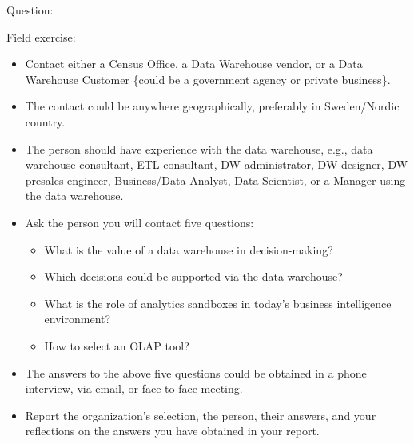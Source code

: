 Question:\\
\begin{em}
Field exercise:

\begin{itemize}
    \item Contact either a Census Office, a Data Warehouse vendor, or a Data Warehouse
    Customer \{could be a government agency or private business\}.
    
    \item The contact could be anywhere geographically, preferably in Sweden/Nordic
    country.
    
    \item The person should have experience with the data warehouse, e.g., data
    warehouse consultant, ETL consultant, DW administrator, DW designer, DW presales
    engineer, Business/Data Analyst, Data Scientist, or a Manager using the
    data warehouse.
    
    \item Ask the person you will contact five questions:
    \begin{itemize}
        \item What is the value of a data warehouse in decision-making?
        \item Which decisions could be supported via the data warehouse?
        \item What is the role of analytics sandboxes in today's business intelligence environment?
        \item How to select an OLAP tool?
    \end{itemize}
    
    \item The answers to the above five questions could be obtained in a phone interview,
    via email, or face-to-face meeting.
    
    \item Report the organization's selection, the person, their answers, and your
    reflections on the answers you have obtained in your report.
\end{itemize}
\end{em}

